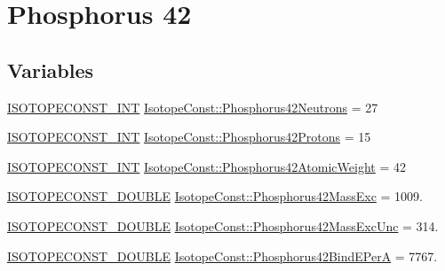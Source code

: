 \hypertarget{group___isotope_const-_phosphorus-_p42}{}\section{Phosphorus 42}
\label{group___isotope_const-_phosphorus-_p42}
\subsection*{Variables}
\begin{DoxyCompactItemize}
\item 
\mbox{\hyperlink{group___isotope_const-_macros_ga5f18360b3e99483a35c32d789e62621c}{I\+S\+O\+T\+O\+P\+E\+C\+O\+N\+S\+T\+\_\+\+I\+NT}} \mbox{\hyperlink{group___isotope_const-_phosphorus-_p42_ga00f0d03722f3f3bfbd480e516a804ac8}{Isotope\+Const\+::\+Phosphorus42\+Neutrons}} = 27
\item 
\mbox{\hyperlink{group___isotope_const-_macros_ga5f18360b3e99483a35c32d789e62621c}{I\+S\+O\+T\+O\+P\+E\+C\+O\+N\+S\+T\+\_\+\+I\+NT}} \mbox{\hyperlink{group___isotope_const-_phosphorus-_p42_gac4031e8c815ddaae2ecb539ffbe7a4d2}{Isotope\+Const\+::\+Phosphorus42\+Protons}} = 15
\item 
\mbox{\hyperlink{group___isotope_const-_macros_ga5f18360b3e99483a35c32d789e62621c}{I\+S\+O\+T\+O\+P\+E\+C\+O\+N\+S\+T\+\_\+\+I\+NT}} \mbox{\hyperlink{group___isotope_const-_phosphorus-_p42_ga60b61057363febfeaec28db82d20cdb0}{Isotope\+Const\+::\+Phosphorus42\+Atomic\+Weight}} = 42
\item 
\mbox{\hyperlink{group___isotope_const-_macros_ga8f45a7272ce02c0b4c65c44636ed719a}{I\+S\+O\+T\+O\+P\+E\+C\+O\+N\+S\+T\+\_\+\+D\+O\+U\+B\+LE}} \mbox{\hyperlink{group___isotope_const-_phosphorus-_p42_gafc65f2bd37a92d65332dfd1e1129fb16}{Isotope\+Const\+::\+Phosphorus42\+Mass\+Exc}} = 1009.
\item 
\mbox{\hyperlink{group___isotope_const-_macros_ga8f45a7272ce02c0b4c65c44636ed719a}{I\+S\+O\+T\+O\+P\+E\+C\+O\+N\+S\+T\+\_\+\+D\+O\+U\+B\+LE}} \mbox{\hyperlink{group___isotope_const-_phosphorus-_p42_ga0fa20e1bc7e7ca711077193c913cf75c}{Isotope\+Const\+::\+Phosphorus42\+Mass\+Exc\+Unc}} = 314.
\item 
\mbox{\hyperlink{group___isotope_const-_macros_ga8f45a7272ce02c0b4c65c44636ed719a}{I\+S\+O\+T\+O\+P\+E\+C\+O\+N\+S\+T\+\_\+\+D\+O\+U\+B\+LE}} \mbox{\hyperlink{group___isotope_const-_phosphorus-_p42_gabd768bea0dc038b095c3befe64fe9a61}{Isotope\+Const\+::\+Phosphorus42\+Bind\+E\+PerA}} = 7767.
\item 

\end{DoxyCompactItemize}
